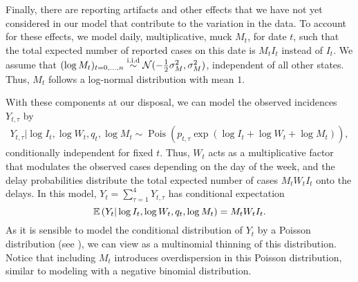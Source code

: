 Finally, there are reporting artifacts and other effects that we have not yet considered in our model that contribute to the variation in the data. To account for these effects, we model daily, multiplicative, \glqq{}muck\grqq{} $M_{t}$, for date $t$, such that the total expected number of reported cases on this date is $M_{t}I_{t}$ instead of $I_{t}$. We assume that $(\log M_{t})_{t = 0, \dots, n} \stackrel{\text{i.i.d}}{\sim} \mathcal N(-\frac{1}{2}\sigma^{2}_M, \sigma^{2}_{M})$, independent of all other states. Thus, $M_{t}$ follows a log-normal distribution with mean $1$. 

With these components at our disposal, we can model the observed incidences $Y_{t, \tau}$ by
\begin{align}
    \label{eq:reporting_delays_Y}
    Y_{t, \tau} | \log I_{t}, \log W_{t}, q_{t}, \log M_{t} \sim \operatorname{Pois} \left( p_{t, \tau}\exp \left(\log I_{t} + \log W_{t}  + \log M_{t}\right) \right),
\end{align}
conditionally independent for fixed $t$. Thus, $W_{t}$ acts as a multiplicative factor that modulates the observed cases depending on the day of the week, and the delay probabilities distribute the total expected number of cases $M_{t}W_{t}I_{t}$ onto the delays. In this model, $Y_{t} = \sum_{\tau = 1}^4 Y_{t, \tau}$ has conditional expectation 
$$
    \mathbb E \left( Y_{t} | \log I_{t}, \log W_{t}, q_{t}, \log M_{t} \right) = M_{t}W_{t}I_t.
$$
As it is sensible to model the conditional distribution of $Y_{t}$ by a Poisson distribution (see ), we can view  as a multinomial thinning of this distribution. Notice that including $M_{t}$ introduces overdispersion in this Poisson distribution, similar to modeling with a negative binomial distribution. 


